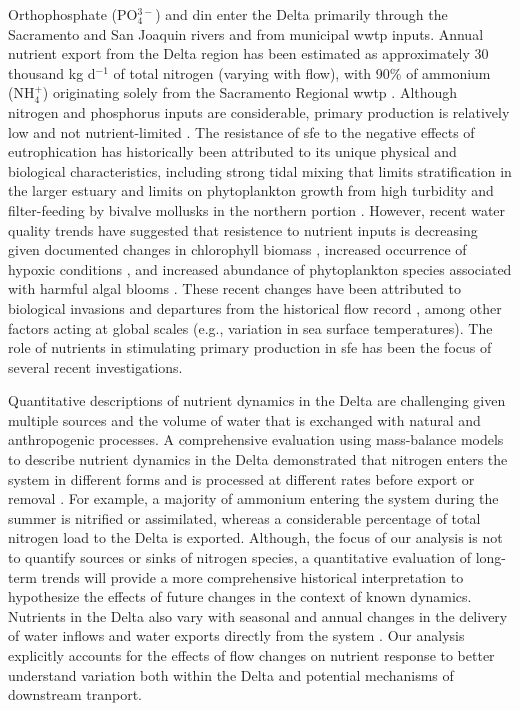 \documentclass[journal = esthag, manuscript = article]{achemso}\usepackage[]{graphicx}\usepackage[]{color}
\begin{document}
Orthophosphate (PO$_4^{3-}$) and \ac{din} enter the Delta primarily through the Sacramento and San Joaquin rivers and from municipal \ac{wwtp} inputs.  Annual nutrient export from the Delta region has been estimated as approximately 30 thousand kg d$^{-1}$ of total nitrogen (varying with flow\cite{Novick15}), with 90\% of ammonium (NH$_4^{+}$) originating solely from the Sacramento Regional \ac{wwtp} \cite{Jassby08}.  Although nitrogen and phosphorus inputs are considerable, primary production is relatively low and not nutrient-limited \cite{Jassby02,Kimmerer12}.  The resistance of \ac{sfe} to the negative effects of eutrophication has historically been attributed to its unique physical and biological characteristics, including strong tidal mixing that limits stratification in the larger estuary \cite{Cloern96,Thompson08} and limits on phytoplankton growth from high turbidity and filter-feeding by bivalve mollusks in the northern portion \cite{Thompson08,Crauder16}.  However, recent water quality trends have suggested that resistence to nutrient inputs is decreasing given documented changes in chlorophyll biomass \cite{Cloern07}, increased occurrence of hypoxic conditions \cite{SutulaIR}, and increased abundance of phytoplankton species associated with harmful algal blooms \cite{Lehman05,Lehman10}.  These recent changes have been attributed to biological invasions \cite{Cohen98} and departures from the historical flow record \cite{Enright09,Cloern12b}, among other factors acting at global scales (e.g., variation in sea surface temperatures).\cite{Cloern07}  The role of nutrients in stimulating primary production in \ac{sfe} has been the focus of several recent investigations.\cite{Dugdale07,Parker12,Glibert14}

Quantitative descriptions of nutrient dynamics in the Delta are challenging given multiple sources and the volume of water that is exchanged with natural and anthropogenic processes.  A comprehensive evaluation using mass-balance models to describe nutrient dynamics in the Delta demonstrated that nitrogen enters the system in different forms and is processed at different rates before export or removal \cite{Novick15}. For example, a majority of ammonium entering the system during the summer is nitrified or assimilated, whereas a considerable percentage of total nitrogen load to the Delta is exported.  Although, the focus of our analysis is not to quantify sources or sinks of nitrogen species, a quantitative evaluation of long-term trends will provide a more comprehensive historical interpretation to hypothesize the effects of future changes in the context of known dynamics.  Nutrients in the Delta also vary with seasonal and annual changes in the delivery of water inflows and water exports directly from the system \cite{Jassby00,Jassby08}.  Our analysis explicitly accounts for the effects of flow changes on nutrient response to better understand variation both within the Delta and potential mechanisms of downstream tranport. 
\end{document}
